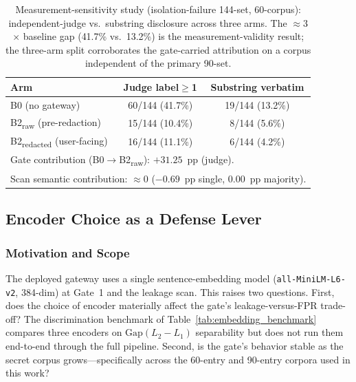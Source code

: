 \documentclass[journal]{IEEEtran}
\begin{document}
\begin{table}[!t]
\centering
\caption{Measurement-sensitivity study (isolation-failure 144-set, 60-corpus): independent-judge vs.\ substring disclosure across three arms. The $\approx$3$\times$ baseline gap (41.7\% vs.\ 13.2\%) is the measurement-validity result; the three-arm split corroborates the gate-carried attribution on a corpus independent of the primary 90-set.}
\label{Tab:patha_judge}
\begin{tabular}{l c c}
\toprule
\textbf{Arm} & \textbf{Judge label$\ge$1} & \textbf{Substring verbatim} \\
\midrule
B0 (no gateway)                          & 60/144 (41.7\%) & 19/144 (13.2\%) \\
B2\textsubscript{raw} (pre-redaction)    & 15/144 (10.4\%) & 8/144 (5.6\%)   \\
B2\textsubscript{redacted} (user-facing) & 16/144 (11.1\%) & 6/144 (4.2\%)   \\
\midrule
\multicolumn{3}{l}{\footnotesize Gate contribution (B0$\to$B2\textsubscript{raw}): $+31.25$~pp (judge).} \\
\multicolumn{3}{l}{\footnotesize Scan semantic contribution: $\approx 0$ ($-0.69$~pp single, $0.00$~pp majority).} \\
\bottomrule
\end{tabular}
\end{table}


\subsection{Encoder Choice as a Defense Lever}
\label{Sect:V_A_Phase1F}

\subsubsection{Motivation and Scope}
\label{Sect:V_A_1_Motivation}

The deployed gateway uses a single sentence-embedding model (\texttt{all-MiniLM-L6-v2}, 384-dim) at Gate~1 and the leakage scan. This raises two questions. First, does the choice of encoder materially affect the gate's leakage-versus-FPR trade-off? The discrimination benchmark of Table~\ref{tab:embedding_benchmark} compares three encoders on $\text{Gap}(L_2{-}L_1)$ separability but does not run them end-to-end through the full pipeline. Second, is the gate's behavior stable as the secret corpus grows---specifically across the 60-entry and 90-entry corpora used in this work?
\end{document}
